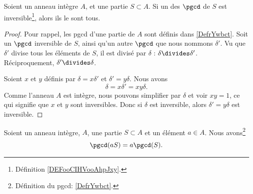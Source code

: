 \begin{lemma}		\label{LEMooSFHMooQoKsPV}
	Soient un anneau intègre \( A\), et une partie \( S\subset A\). Si un des \( \pgcd\) de \( S\) est inversible\footnote{Définition \ref{DEFooCIHVooAhpJxy}.}, alors ils le sont tous.
\end{lemma}

\begin{proof}
	Pour rappel, les pgcd d'une partie de \(A\) sont définis dans \ref{DefrYwbct}. Soit un \( \pgcd\) inversible de \( S\), ainsi qu'un autre \( \pgcd\) que nous nommons \( \delta'\). Vu que \( \delta'\) divise tous les éléments de \( S\), il est divisé par \( \delta\) : \( \delta\divides\delta'\). Réciproquement, \( \delta'\divides \delta\).

	Soient \( x\) et \( y\) définis par \( \delta=x\delta'\) et \( \delta'=y\delta\). Nous avons
	\begin{equation}
		\delta=x\delta'=xy\delta.
	\end{equation}
	Comme l'anneau \( A\) est intègre, nous pouvons simplifier par \( \delta\) et voir \( xy=1\), ce qui signifie que \( x\) et \( y\) sont inversibles. Donc si \( \delta\) est inversible, alors \( \delta'=y\delta\) est inversible.
\end{proof}

\begin{lemma}		\label{LEMooMHZQooIcSNSf}
	Soient un anneau intègre, \( A\), une partie \( S\subset A\) et un élément \( a\in A\). Nous avons\footnote{Définition du pgcd: \ref{DefrYwbct}.}
	\begin{equation}
		\pgcd(aS)=a\pgcd(S).
	\end{equation}
\end{lemma}

